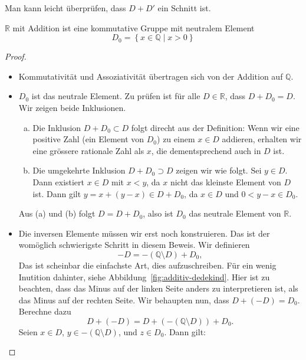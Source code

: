 \documentclass[../main.tex]{subfiles}
\begin{document}
Man kann leicht überprüfen, dass $D + D'$ ein Schnitt ist.

\begin{manuallemma}{1}
  $\mathbb R$ mit Addition ist eine kommutative Gruppe mit neutralem Element
  \[D_{0} = \left\{x \in \mathbb Q \mid x > 0\right\}\]
\end{manuallemma}

\begin{proof}
  \leavevmode
  \begin{itemize}
    \item Kommutativität und Assoziativität übertragen sich von der Addition
      auf $\mathbb Q$.
    \item $D_{0}$ ist das neutrale Element. Zu prüfen ist
      für alle $D \in \mathbb R$, dass $D + D_{0} = D$. Wir
      zeigen beide Inklusionen.
      \begin{enumerate}[(a)]
        \item Die Inklusion $D + D_{0} \subset D$ folgt direcht aus
          der Definition: Wenn wir eine positive Zahl
          (ein Element von $D_{0}$) zu einem
          $x \in D$ addieren, erhalten wir eine grössere
          rationale Zahl als $x$, die dementsprechend auch in $D$ ist.
        \item Die umgekehrte Inklusion $D + D_{0} \supset D$ zeigen
          wir wie folgt. Sei $y \in D$. Dann existiert $x \in D$ mit
          $x < y$, da $x$ nicht das kleinste Element von $D$ ist.
          Dann gilt $y = x + (y - x) \in D + D_{0}$, da $x \in D$
          und $0 < y - x \in D_{0}$.
      \end{enumerate}
      Aus (a) und (b) folgt $D = D + D_{0}$, also ist $D_{0}$ das
      neutrale Element von $\mathbb R$.
    \item Die inversen Elemente müssen wir erst noch konstruieren.
      Das ist der womöglich schwierigste Schritt in diesem Beweis.
      Wir definieren
      \[-D = -(\mathbb Q \setminus D) + D_{0},\]
      Das ist scheinbar die einfachste Art, dies aufzuschreiben.
      Für ein wenig Inutition dahinter, siehe
      Abbildung~\ref{fig:additiv-dedekind}.
      Hier ist zu beachten, dass das Minus auf der linken Seite
      anders zu interpretieren ist, als das Minus auf der rechten
      Seite.
      Wir behaupten nun, dass $D + (-D) = D_{0}$. Berechne dazu
        \[D + (-D) = D  + (-(\mathbb Q \setminus D)) + D_{0}.\]
      Seien $x \in D$, $y \in -(\mathbb Q \setminus D)$, und $z \in D_{0}$.
      Dann gilt:
      \begin{enumerate}[(i)]

\end{enumerate}
\end{itemize}
\end{proof}
\end{document}

